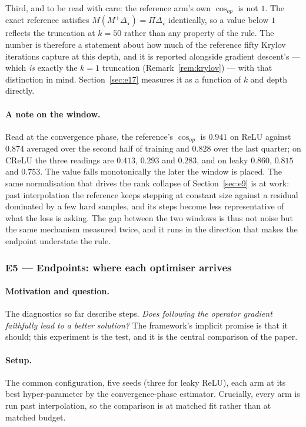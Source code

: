 \documentclass{article} %
\theoremstyle{plain}
\theoremstyle{definition}
\theoremstyle{remark}
\begin{document}
Third, and to be read with care: the reference arm's own $\cos_{op}$ is not $1$. The exact
reference satisfies $M(M^{+}\Delta_\star) = \Pi\Delta_\star$ identically, so a value below $1$
reflects the truncation at $k=50$ rather than any property of the rule. The number is therefore a
statement about how much of the reference fifty Krylov iterations capture at this depth, and it is
reported alongside gradient descent's --- which \emph{is} exactly the $k=1$ truncation
(Remark~\ref{rem:krylov}) --- with that distinction in mind. Section~\ref{sec:e17}
measures it as a function of $k$ and depth directly.

\paragraph{A note on the window.} Read at the convergence phase, the reference's $\cos_{op}$ is
$0.941$ on ReLU against $0.874$ averaged over the second half of training and $0.828$ over the last
quarter; on CReLU the three readings are $0.413$, $0.293$ and $0.283$, and on leaky $0.860$,
$0.815$ and $0.753$. The value falls monotonically the later the window is placed. The
same normalisation that drives the rank collapse of Section~\ref{sec:e9} is at work: past
interpolation the reference keeps stepping at constant size against a residual dominated by a few
hard samples, and its steps become less representative of what the loss is asking. The gap between
the two windows is thus not noise but the same mechanism measured twice, and it runs in the
direction that makes the endpoint understate the rule.

\subsubsection{E5 --- Endpoints: where each optimiser arrives}
\label{sec:e5}

\paragraph{Motivation and question.}
The diagnostics so far describe steps. \emph{Does following the operator gradient faithfully lead
to a better solution?} The framework's implicit promise is that it should; this experiment is the
test, and it is the central comparison of the paper.

\paragraph{Setup.}
The common configuration, five seeds (three for leaky ReLU), each arm at its best hyper-parameter by
the convergence-phase estimator. Crucially, every arm is run past interpolation, so the comparison
is at matched fit rather than at matched budget.
\end{document}
